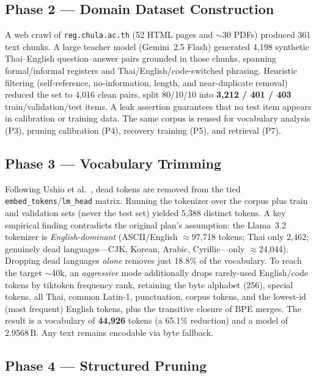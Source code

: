 \documentclass[11pt,a4paper]{article}
\newcommand{\param}[1]{\ensuremath{#1\,\text{B}}}
\begin{document}
\subsection{Phase 2 --- Domain Dataset Construction}
A web crawl of \texttt{reg.chula.ac.th} (52 HTML pages and $\sim$30 PDFs)
produced 361 text chunks. A large teacher model (Gemini~2.5 Flash) generated
4{,}198 synthetic Thai--English question--answer pairs grounded in those
chunks, spanning formal/informal registers and Thai/English/code-switched
phrasing. Heuristic filtering (self-reference, no-information, length, and
near-duplicate removal) reduced the set to 4{,}016 clean pairs, split
80/10/10 into \textbf{3{,}212 / 401 / 403} train/validation/test items. A
leak assertion guarantees that no test item appears in calibration or
training data. The same corpus is reused for vocabulary analysis (P3),
pruning calibration (P4), recovery training (P5), and retrieval (P7).

\subsection{Phase 3 --- Vocabulary Trimming}
Following Ushio et al.~\cite{ushio2023vocab}, dead tokens are removed from the
tied \texttt{embed\_tokens}/\texttt{lm\_head} matrix. Running the tokenizer
over the corpus plus train and validation sets (never the test set) yielded
5{,}388 distinct tokens. A key empirical finding contradicts the original
plan's assumption: the Llama~3.2 tokenizer is \emph{English-dominant}
(ASCII/English $\approx$97{,}718 tokens; Thai only 2{,}462; genuinely dead
languages---CJK, Korean, Arabic, Cyrillic---only $\approx$24{,}044). Dropping
dead languages \emph{alone} removes just 18.8\% of the vocabulary. To reach
the target $\sim$40k, an \emph{aggressive} mode additionally drops
rarely-used English/code tokens by tiktoken frequency rank, retaining the
byte alphabet (256), special tokens, all Thai, common Latin-1, punctuation,
corpus tokens, and the lowest-id (most frequent) English tokens, plus the
transitive closure of BPE merges. The result is a vocabulary of
\textbf{44{,}926} tokens (a 65.1\% reduction) and a model of
\textbf{\param{2.9568}}. Any text remains encodable via byte fallback.

\subsection{Phase 4 --- Structured Pruning}
\end{document}
